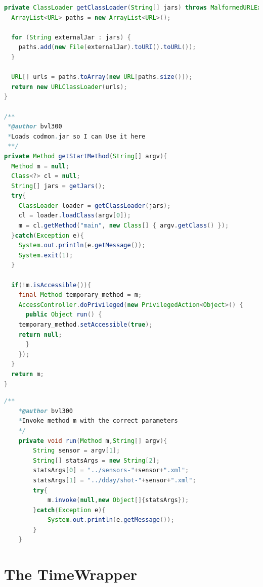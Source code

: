 \documentclass{article}
\begin{document}
\begin{lstlisting}[frame=single ,language=Java]
private ClassLoader getClassLoader(String[] jars) throws MalformedURLException, SecurityException{
  ArrayList<URL> paths = new ArrayList<URL>();

  for (String externalJar : jars) {
    paths.add(new File(externalJar).toURI().toURL());
  }
  
  URL[] urls = paths.toArray(new URL[paths.size()]);
  return new URLClassLoader(urls);
}	

/**
 *@author bvl300
 *Loads codmon.jar so I can Use it here
 **/
private Method getStartMethod(String[] argv){	
  Method m = null;
  Class<?> cl = null;
  String[] jars = getJars();
  try{
    ClassLoader loader = getClassLoader(jars);
    cl = loader.loadClass(argv[0]);
    m = cl.getMethod("main", new Class[] { argv.getClass() });
  }catch(Exception e){
    System.out.println(e.getMessage());
    System.exit(1);
  }

  if(!m.isAccessible()){
    final Method temporary_method = m;
    AccessController.doPrivileged(new PrivilegedAction<Object>() {
      public Object run() {
	temporary_method.setAccessible(true);
	return null;
      }
    });
  }
  return m;
} 
\end{lstlisting} 
\newpage
{}
\begin{lstlisting}[frame=single ,language=Java]
	/**
 	*@author bvl300
 	*Invoke method m with the correct parameters
 	*/ 
	private void run(Method m,String[] argv){
		String sensor = argv[1];
		String[] statsArgs = new String[2];
		statsArgs[0] = "../sensors-"+sensor+".xml";
		statsArgs[1] = "../dday/shot-"+sensor+".xml";
		try{
			m.invoke(null,new Object[]{statsArgs});
		}catch(Exception e){
			System.out.println(e.getMessage());
		}
	}
\end{lstlisting}  

\newpage
\section{The TimeWrapper}
\label{AppendixB}
\end{document}

